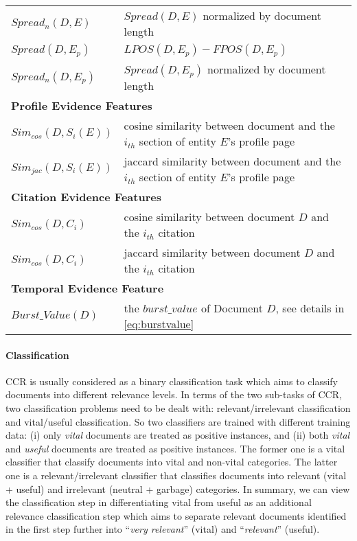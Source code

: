 \documentclass{sig-alternate}
\begin{document}
\begin{table}[thbp]
\begin{tabular}{lp{}}
$Spread_{n}(D, E)$ & $Spread(D, E)$ normalized by document length \\
$Spread(D, E_{p})$ & $LPOS(D, E_{p})-FPOS(D, E_{p})$ \\
$Spread_{n}(D, E_{p})$ & $Spread(D, E_{p})$ normalized by document length \\ \hline
\multicolumn{2}{l}{\textbf{Profile Evidence Features}} \\ \hline
$Sim_{cos}(D, S_{i}(E))$ & cosine similarity between document and the $i_{th}$ section of entity $E$'s profile page \\
$Sim_{jac}(D, S_{i}(E))$ & jaccard similarity between document and the $i_{th}$ section of entity $E$'s profile page \\ \hline
\multicolumn{2}{l}{\textbf{Citation Evidence Features}} \\ \hline
$Sim_{cos}(D, C_{i})$ & cosine similarity between document $D$ and the $i_{th}$ citation \\
$Sim_{cos}(D, C_{i})$ & jaccard similarity between document $D$ and the $i_{th}$ citation \\ \hline
\multicolumn{2}{l}{\textbf{Temporal Evidence Feature}} \\ \hline
$Burst\_Value (D)$  & the $burst\_value$ of Document $D$, see details in \autoref{eq:burstvalue} \\ \hline
\end{tabular}
\end{table}

\paragraph{Classification}
CCR is usually considered as a binary classification task which aims to classify documents into different relevance levels. In terms of the two sub-tasks of CCR, two classification problems need to be dealt with: relevant/irrelevant classification and vital/useful classification. So two classifiers are trained with different training data: (i) only \textit{vital} documents are treated as positive instances, and (ii) both \textit{vital} and \textit{useful} documents are treated as positive instances. The former one is a vital classifier that classify documents into vital and non-vital categories. The latter one is a relevant/irrelevant classifier that classifies documents into relevant (vital + useful) and irrelevant (neutral + garbage) categories. In summary, we can view the classification step in differentiating vital from useful as an additional relevance classification step which aims to separate relevant documents identified in the first step further into ``{\em very relevant}'' (vital) and ``{\em relevant}'' (useful).
\end{document}
